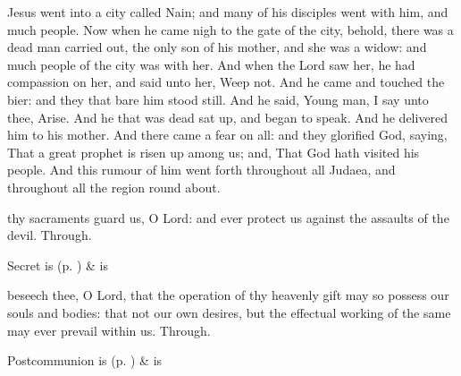 
 Jesus went into a city called Nain; and many of his disciples went with him, and much people. Now when he came nigh to the gate of the city, behold, there was a dead man carried out, the only son of his mother, and she was a widow: and much people of the city was with her. And when the Lord saw her, he had compassion on her, and said unto her, Weep not. And he came and touched the bier: and they that bare him stood still. And he said, Young man, I say unto thee, Arise. And he that was dead sat up, and began to speak. And he delivered him to his mother. And there came a fear on all: and they glorified God, saying, That a great prophet is risen up among us; and, That God hath visited his people. And this rumour of him went forth throughout all Judaea, and throughout all the region round about.


\secret
{} thy sacraments guard us, O Lord: and ever protect us against the assaults of the devil. Through.


\begin{rubric}
     Secret is  (p. \pageref{SPSaints}) \&  is 
\end{rubric}


\postcommunion
{} beseech thee, O Lord, that the operation of thy heavenly gift may so possess our souls and bodies: that not our own desires, but the effectual working of the same may ever prevail within us. Through.
\begin{rubric}
     Postcommunion is  (p. \pageref{SPSaints}) \&  is 
\end{rubric}



